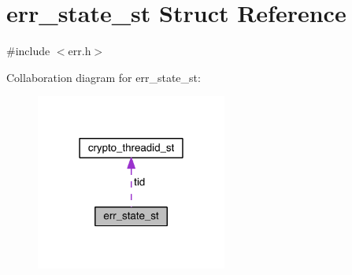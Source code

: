 \hypertarget{structerr__state__st}{}\section{err\+\_\+state\+\_\+st Struct Reference}
\label{structerr__state__st}


{\ttfamily \#include $<$err.\+h$>$}



Collaboration diagram for err\+\_\+state\+\_\+st\+:\nopagebreak
\begin{figure}[H]
\begin{center}
\leavevmode
\includegraphics[width=178pt]{structerr__state__st__coll__graph}
\end{center}
\end{figure}
